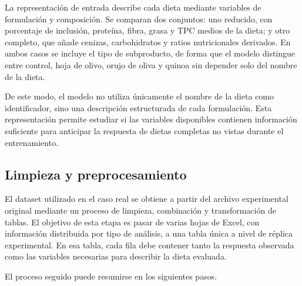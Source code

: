 La representación de entrada describe cada dieta mediante variables de formulación y composición. Se comparan dos conjuntos: uno reducido, con porcentaje de inclusión, proteína, fibra, grasa y TPC medios de la dieta; y otro completo, que añade cenizas, carbohidratos y ratios nutricionales derivados. En ambos casos se incluye el tipo de subproducto, de forma que el modelo distingue entre control, hoja de olivo, orujo de oliva y quinoa sin depender solo del nombre de la dieta.

De este modo, el modelo no utiliza únicamente el nombre de la dieta como identificador, sino una descripción estructurada de cada formulación. Esta representación permite estudiar si las variables disponibles contienen información suficiente para anticipar la respuesta de dietas completas no vistas durante el entrenamiento.

\subsection{Limpieza y preprocesamiento}\label{subsec:preprocesamiento_caso_real}

El dataset utilizado en el caso real se obtiene a partir del archivo experimental original mediante un proceso de limpieza, combinación y transformación de tablas. El objetivo de esta etapa es pasar de varias hojas de Excel, con información distribuida por tipo de análisis, a una tabla única a nivel de réplica experimental. En esa tabla, cada fila debe contener tanto la respuesta observada como las variables necesarias para describir la dieta evaluada.

El proceso seguido puede resumirse en los siguientes pasos.

